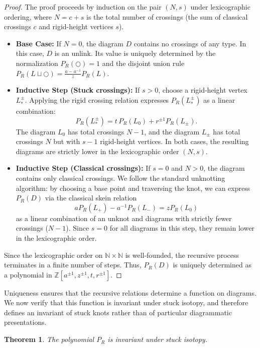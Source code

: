 \documentclass[11pt,a4paper]{article}
\theoremstyle{plain}
\newtheorem{theorem}{Theorem}[section]
\theoremstyle{definition}
\begin{document}
\begin{proof}
The proof proceeds by induction on the pair $(N, s)$ under lexicographic ordering, where $N = c + s$ is the total number of crossings (the sum of classical crossings $c$ and rigid-height vertices $s$).

\begin{itemize}
    \item \textbf{Base Case:} If $N=0$, the diagram $D$ contains no crossings of any type. In this case, $D$ is an unlink. Its value is uniquely determined by the normalization $P_R(\bigcirc)=1$ and the disjoint union rule $P_R(L \sqcup \bigcirc) = \frac{a-a^{-1}}{z} P_R(L)$.

    \item \textbf{Inductive Step (Stuck crossings):} If $s > 0$, choose a rigid-height vertex $L_{\ast}^{\pm}$. Applying the rigid crossing relation expresses $P_R(L_{\ast}^{\pm})$ as a linear combination:
    \[
    P_R(L_{\ast}^{\pm}) = t\,P_R(L_0) + r^{\pm 1}P_R(L_{\pm}).
    \]
    The diagram $L_0$ has total crossings $N-1$, and the diagram $L_{\pm}$ has total crossings $N$ but with $s-1$ rigid-height vertices. In both cases, the resulting diagrams are strictly lower in the lexicographic order $(N, s)$.

    \item \textbf{Inductive Step (Classical crossings):} If $s = 0$ and $N > 0$, the diagram contains only classical crossings. We follow the standard unknotting algorithm: by choosing a base point and traversing the knot, we can express $P_R(D)$ via the classical skein relation 
    \[
    aP_R(L_+) - a^{-1}P_R(L_-) = zP_R(L_0)
    \]
    as a linear combination of an unknot and diagrams with strictly fewer crossings ($N-1$). Since $s=0$ for all diagrams in this step, they remain lower in the lexicographic order.
\end{itemize}

Since the lexicographic order on $\mathbb{N} \times \mathbb{N}$ is well-founded, the recursive process terminates in a finite number of steps. Thus, $P_R(D)$ is uniquely determined as a polynomial in $\mathbb{Z}[a^{\pm 1}, z^{\pm 1}, t, r^{\pm 1}]$.
\end{proof}

Uniqueness ensures that the recursive relations determine a function on diagrams. We now verify that this function is invariant under stuck isotopy, and therefore defines an invariant of stuck knots rather than of particular diagrammatic presentations.


\begin{theorem}
The polynomial $P_R$ is invariant under stuck isotopy.
\end{theorem}
\end{document}
